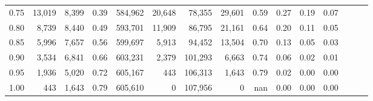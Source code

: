 \begin{tabular}{rrrrrrrrrrrrrrr}
0.75 &  13,019 &  8,399 &  0.39 &  584,962 &   20,648 &   78,355 &   29,601 &  0.59 &  0.27 &  0.19 &      0.07 \\
0.80 &   8,739 &  8,440 &  0.49 &  593,701 &   11,909 &   86,795 &   21,161 &  0.64 &  0.20 &  0.11 &      0.05 \\
0.85 &   5,996 &  7,657 &  0.56 &  599,697 &    5,913 &   94,452 &   13,504 &  0.70 &  0.13 &  0.05 &      0.03 \\
0.90 &   3,534 &  6,841 &  0.66 &  603,231 &    2,379 &  101,293 &    6,663 &  0.74 &  0.06 &  0.02 &      0.01 \\
0.95 &   1,936 &  5,020 &  0.72 &  605,167 &      443 &  106,313 &    1,643 &  0.79 &  0.02 &  0.00 &      0.00 \\
1.00 &     443 &  1,643 &  0.79 &  605,610 &        0 &  107,956 &        0 &   nan &  0.00 &  0.00 &      0.00 \\
\bottomrule
\end{tabular}
